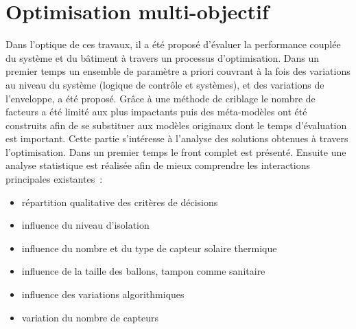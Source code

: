 


\section{Optimisation multi-objectif} %
\label{sec:optimisation_multi_objectif}
Dans l’optique de ces travaux, il a été proposé d’évaluer la performance couplée
du système et du bâtiment à travers un processus d’optimisation. Dans un premier temps
un ensemble de paramètre a priori couvrant à la fois des variations
au niveau du système (logique de contrôle et systèmes), et des variations de l’enveloppe,
a été proposé. Grâce à une méthode de criblage le nombre de facteurs a été limité
aux plus impactants puis des méta-modèles ont été construits afin de se substituer
aux modèles originaux dont le temps d’évaluation est important.
Cette partie s’intéresse à l’analyse des solutions obtenues à travers l’optimisation.
Dans un premier temps le front complet est présenté. Ensuite une analyse statistique
est réalisée afin de mieux comprendre les interactions principales existantes~:
\begin{itemize}
  \item répartition qualitative des critères de décisions
  \item influence du niveau d’isolation
  \item influence du nombre et du type de capteur solaire thermique
  \item influence de la taille des ballons, tampon comme sanitaire
  \item influence des variations algorithmiques
  \item variation du nombre de capteurs 
\end{itemize}


